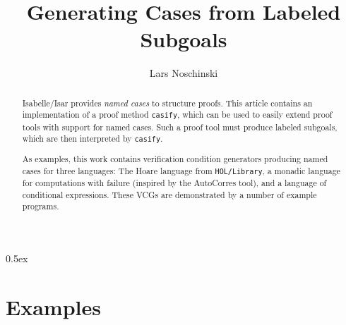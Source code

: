 \documentclass[11pt,a4paper]{article}
\begin{document}
\title{Generating Cases from Labeled Subgoals}
\author{Lars Noschinski}
\maketitle

\tableofcontents

\parindent 0pt\parskip 0.5ex

\begin{abstract}
  Isabelle/Isar provides \emph{named cases} to structure proofs. This article contains
  an implementation of a proof method \texttt{casify}, which can be used to easily extend proof
  tools with support for named cases. Such a proof tool must produce labeled subgoals, which
  are then interpreted by \texttt{casify}.


As examples, this work contains verification condition generators
producing named cases for three languages: The Hoare language from
\texttt{HOL/Library}, a monadic language for computations with failure
(inspired by the AutoCorres tool), and a language of conditional
expressions. These VCGs are demonstrated by a number of example programs.
\end{abstract}




\section{Examples}







\end{document}
